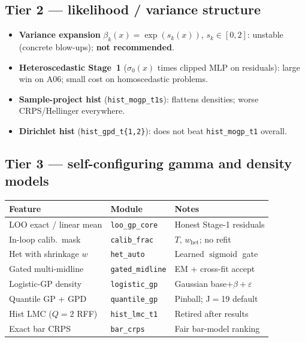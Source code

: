 \documentclass[11pt,a4paper]{article}
\theoremstyle{definition}
\newcommand{\sigmoid}{\operatorname{sigmoid}}
\begin{document}
\subsection{Tier 2 --- likelihood / variance structure}
\begin{itemize}[leftmargin=1.4em,itemsep=0.15em]
  \item \textbf{Variance expansion} $\beta_k(x)=\exp(s_k(x))$, $s_k\in[0,2]$:
        unstable (concrete blow-ups); \textbf{not recommended}.
  \item \textbf{Heteroscedastic Stage~1} ($\sigma_0(x)$ times clipped MLP on
        residuals): large win on A06; small cost on homoscedastic problems.
  \item \textbf{Sample-project hist} (\texttt{hist\_mogp\_t1s}): flattens
        densities; worse CRPS/Hellinger everywhere.
  \item \textbf{Dirichlet hist} (\texttt{hist\_gpd\_t\{1,2\}}): does not beat
        \texttt{hist\_mogp\_t1} overall.
\end{itemize}

\subsection{Tier 3 --- self-configuring gamma and density models}
\begin{center}
\renewcommand{\arraystretch}{1.05}
\small
\begin{tabular}{@{}llp{5.6cm}@{}}
\toprule
Feature & Module & Notes \\
\midrule
LOO exact / linear mean & \texttt{loo\_gp\_core} & Honest Stage-1 residuals \\
In-loop calib.\ mask & \texttt{calib\_frac} & $T$, $w_{\mathrm{het}}$; no refit \\
Het with shrinkage $w$ & \texttt{het\_auto} & Learned $\sigmoid$ gate \\
Gated multi-midline & \texttt{gated\_midline} & EM + cross-fit accept \\
Logistic-GP density & \texttt{logistic\_gp} & Gaussian base$+\beta+\varepsilon$ \\
Quantile GP + GPD & \texttt{quantile\_gp} & Pinball; J$=$19 default \\
Hist LMC ($Q{=}2$ RFF) & \texttt{hist\_lmc\_t1} & Retired after results \\
Exact bar CRPS & \texttt{bar\_crps} & Fair bar-model ranking \\
\bottomrule
\end{tabular}
\end{center}
\end{document}
